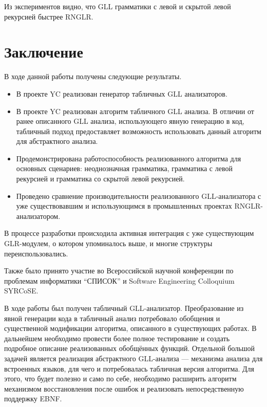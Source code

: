Из экспериментов видно, что GLL грамматики с левой и скрытой левой рекурсией быстрее RNGLR.

\section*{Заключение}
В ходе данной работы получены следующие результаты.
\begin{itemize}
\item В проекте YC реализован генератор табличных GLL анализаторов.
\item В проекте YC реализован алгоритм табличного GLL анализа. В отличии от ранее описанного GLL анализа, использующего явную генерацию в код, табличный подход предоставляет возможность использовать данный алгоритм для абстрактного анализа.
\item Продемонстрирована работоспособность реализованного алгоритма для основных сценариев: неоднозначная грамматика, грамматика с левой рекурсией и грамматика со скрытой левой рекурсией.
\item Проведено сравнение производительности реализованного GLL-анализатора с уже существовавшим и использующимся в промышленных проектах RNGLR-анализатором.
\end{itemize}

В процессе разработки происходила активная интеграция с уже существующим GLR-модулем, о котором упоминалось выше, и многие структуры переиспользовались.

Также было принято участие во Всероссийской научной конференции по проблемам информатики “СПИСОК” и Software Engineering Colloquium SYRCoSE. 

В ходе работы был получен табличный GLL-анализатор. Преобразование из явной генерации кода в табличный анализ потребовало обобщения  и существенной модификации алгоритма, описанного в существующих работах. В дальнейшем необходимо провести более полное тестирование и создать подробное описание реализованных обобщённых функций. 
Отдельной большой задачей является реализация абстрактного GLL-анализа --- механизма анализа для встроенных языков, для чего и потребовалась табличная версия алгоритма. Для этого, что будет полезно и само по себе, необходимо расширить алгоритм механизмом восстановления после ошибок и реализовать непосредственную поддержку EBNF.
 

